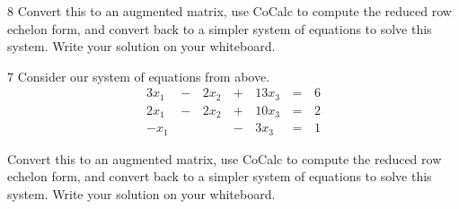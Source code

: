 \begin{applicationActivities}
\begin{activity}{8}
Convert this to an augmented matrix, use CoCalc to compute the reduced row echelon form, and convert back to a simpler system of equations to solve this system.  Write your solution on your whiteboard.
\end{activity}

\begin{activity}{7}
Consider our system of equations from above.
 \[
		\begin{alignedat}{4}
   		  3x_1 &\,-\,& 2x_2 &\,+\,& 13x_3 &\,=\,& 6 \\
   		  2x_1 &\,-\,& 2x_2 &\,+\,& 10x_3 &\,=\,& 2 \\
   		  -x_1 &\,\,&  &\,-\,&  3x_3 &\,=\,&1
   		\end{alignedat}
\]

Convert this to an augmented matrix, use CoCalc to compute the reduced row echelon form, and convert back to a simpler system of equations to solve this system.  Write your solution on your whiteboard.
\end{activity}



\end{applicationActivities}
